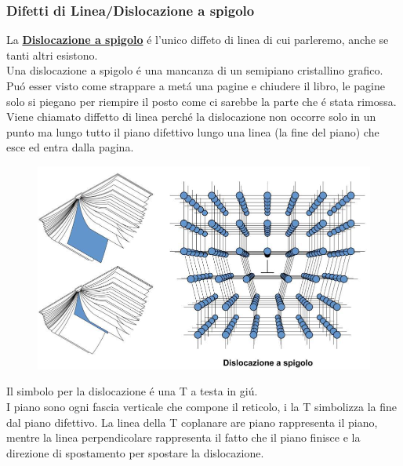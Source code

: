 \documentclass{article}
\begin{document}
            \subsubsection{Difetti di Linea/Dislocazione a spigolo}
                La \underline{\textbf{Dislocazione a spigolo}} \'e l'unico diffeto di linea di cui parleremo, anche se tanti altri esistono.\\
                Una dislocazione a spigolo \'e una mancanza di un semipiano cristallino grafico. Pu\'o esser visto come strappare a met\'a una pagine e chiudere il libro, le pagine solo si piegano per riempire il posto come ci sarebbe la parte che \'e stata rimossa. Viene chiamato diffetto di linea perch\'e la dislocazione non occorre solo in un punto ma lungo tutto il piano difettivo lungo una linea (la fine del piano) che esce ed entra dalla pagina.
                \begin{figure}[h!]
                    \centering
                    \includegraphics[width=.85\linewidth]{Dislocazione a Spigolo.png}
                \end{figure}
                Il simbolo per la dislocazione \'e una T a testa in gi\'u.\\
                I piano sono ogni fascia verticale che compone il reticolo, i la T simbolizza la fine dal piano difettivo. La linea della T coplanare are piano rappresenta il piano, mentre la linea perpendicolare rappresenta il fatto che il piano finisce e la direzione di spostamento per spostare la dislocazione.\\ \\ \\
\end{document}
